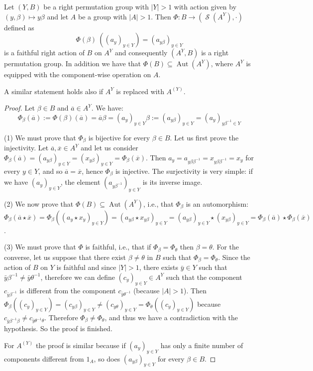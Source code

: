 \documentclass[mat1]{fmfdeloTS2.0}
\DeclareMathOperator{\aut}{\mathrm{Aut}}		%
\DeclareMathOperator{\symm}{\mathcal{S}}		%
\begin{document}
\begin{proposition}
Let $(Y,B)$ be a right permutation group with $|Y|>1$ with action given by $(y,\beta)\mapsto y\beta$ and let $A$ be a group with $|A|>1$. Then $\Phi:B\longrightarrow(\symm(A^Y),\cdot)$ defined as 
$$\Phi( \beta)\:((a_y)_{y\in Y})=(a_{y\beta})_{y\in Y}$$
is a faithful right action of $B$ on $A^Y$ and consequently $(A^Y,B)$ is a right permutation group. In addition we have that $\Phi(B)\subseteq\aut(A^Y)$, where $A^Y$ is equipped with the component-wise operation on $A$.

A similar statement holds also if $A^{Y}$ is replaced with $A^{(Y)}$.
\label{prop:extended right action}
\end{proposition}
\begin{proof}
Let $\beta\in B$ and $\overline{a}\in A^Y$. We have:
$$\Phi_\beta(\overline{a}):=\Phi(\beta)(\overline{a})= \overline{a}\beta=(a_y)_{y\in Y}\beta:=(a_{y\beta})_{y\in Y}=(a_{y})_{y\beta^{-1}\in Y}$$

(1) We must prove that $\Phi_\beta$ is bijective for every $\beta\in B$. Let us first prove the injectivity. Let $\overline{a},\overline{x}\in A^Y$ and let us consider $\Phi_\beta(\overline{a})=(a_{y\beta})_{y\in Y} = (x_{y\beta})_{y\in Y}=\Phi_\beta(\overline{x})$. Then $a_y=a_{y\beta\beta^{-1}}=x_{y\beta\beta^{-1}}=x_y$ for every $y\in Y$, and so $\overline{a}=\overline{x}$, hence $\Phi_\beta$ is injective. The surjectivity is very simple: if we have $(a_y)_{y\in Y}$, the element $(a_{y\beta^{-1}})_{y\in Y}$ is its inverse image.

(2) We now prove that $\Phi(B)\subseteq\aut(A^Y)$, i.e., that $\Phi_\beta$ is an automorphism: $\Phi_\beta(\overline{a}\star\overline{x}) = \Phi_\beta((a_y\star x_y)_{y\in Y}) = (a_{y\beta }\star x_{y\beta })_{y\in Y} = (a_{y\beta})_{y\in Y}\star (x_{y\beta})_{y\in Y}=\Phi_\beta(\overline{a})\star \Phi_\beta(\overline{x})$.

(3) We must prove that $\Phi$ is faithful, i.e., that if $\Phi_\beta=\Phi_\theta$ then $\beta=\theta$. For the converse, let us suppose that there exist $\beta\neq\theta$ in $B$ such that $\Phi_\beta=\Phi_\theta$. Since the action of $B$ on $Y$ is faithful and since $|Y|>1$, there exists $\bar{y}\in Y$ such that $\bar{y}\beta^{-1}\neq \bar{y}\theta^{-1}$, therefore we can define $(c_y)_{y\in Y}\in A^Y$ such that the component $c_{\bar{y}\beta^{-1}}$ is different from the component $ c_{\bar{y}\theta^{-1}}$ (because $|A|>1$). Then $\Phi_\beta((c_y)_{y\in Y})=(c_{y\beta})_{y\in Y}\neq(c_{y\theta})_{y\in Y}=\Phi_\theta((c_{y})_{y\in Y})$ because $c_{\bar{y}\beta^{-1}\beta}\neq c_{\bar{y}\theta^{-1}\theta}$. Therefore $\Phi_\beta\neq\Phi_\theta$, and thus we have a contradiction with the hypothesis. So the proof is finished.

For $A^{(Y)}$ the proof is similar because if $(a_{y})_{y\in Y}$ has only a finite number of components different from $1_A$, so does $(a_{y\beta})_{y\in Y}$ for every $\beta\in B$.
\end{proof}
\end{document}
